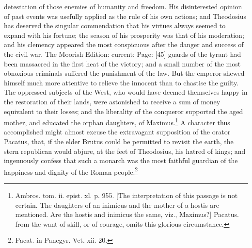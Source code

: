 detestation of those enemies of humanity and freedom. His disinterested opinion of past events was usefully applied as the rule of his own actions; and Theodosius has deserved the singular commendation that his virtues always seemed to expand with his fortune; the season of his prosperity was that of his moderation; and his clemency appeared the most conspicuous after the danger and success of the civil war. The Moorish Edition: current; Page: [45] guards of the tyrant had been massacred in the first heat of the victory; and a small number of the most obnoxious criminals suffered the punishment of the law. But the emperor shewed himself much more attentive to relieve the innocent than to chastise the guilty. The oppressed subjects of the West, who would have deemed themselves happy in the restoration of their lands, were astonished to receive a sum of money equivalent to their losses; and the liberality of the conqueror supported the aged mother, and educated the orphan daughters, of Maximus.\footnote{Ambros. tom. ii. epist. xl. p. 955. [The interpretation of this passage is not certain. The daughters of an inimicus and the mother of a hostis are mentioned. Are the hostis and inimicus the same, viz., Maximus?] Pacatus. from the want of skill, or of courage, omits this glorious circumstance.} A character thus accomplished might almost excuse the extravagant supposition of the orator Pacatus, that, if the elder Brutus could be permitted to revisit the earth, the stern republican would abjure, at the feet of Theodosius, his hatred of kings; and ingenuously confess that such a monarch was the most faithful guardian of the happiness and dignity of the Roman people.\footnote{Pacat. in Panegyr. Vet. xii. 20.}

